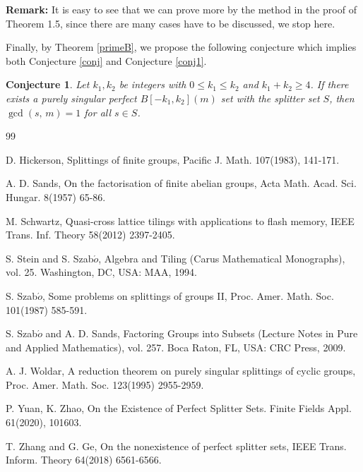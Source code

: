 \documentclass[12pt]{article}
\newtheorem{open problem}{Open problem}[section]
\newtheorem{conj}{Conjecture}[section]
\begin{document}
{\bf Remark:} It is easy to see that we can prove more by the method in the proof of Theorem 1.5, since there are many cases have to be discussed, we stop here.

Finally, by Theorem \ref{primeB}, we propose the following conjecture which implies both Conjecture \ref{conj} and  Conjecture \ref{conj1}.


\begin{conj} \label{conj2}
Let $k_1, k_2$ be integers with $0 \le k_1 \leq k_2$ and
$k_1 + k_2\ge 4$.
If there exists a purely singular perfect $B[-k_1,k_2](m)$ set with the splitter set $S$,
then $\gcd(s, \,m)=1$ for all $s\in S$.
\end{conj}






%
\begin{thebibliography}{99}

\bibitem{[H]} D. Hickerson, Splittings of finite groups,  Pacific J. Math. 107(1983), 141-171.

 A. D. Sands,  On the factorisation of finite abelian groups,  Acta Math. Acad. Sci. Hungar. 8(1957) 65-86.


\bibitem{[SC]} M. Schwartz, Quasi-cross lattice tilings with applications to flash
memory, IEEE Trans. Inf. Theory 58(2012) 2397-2405.



\bibitem{[SAT]}  S. Stein and S. Szab$\acute{o}$, Algebra and Tiling (Carus Mathematical
Monographs), vol. 25. Washington, DC, USA: MAA,
1994.



\bibitem{[SS]} S. Szab$\acute{o}$, Some problems on splittings of groups II,  Proc. Amer. Math.
Soc. 101(1987) 585-591.

 S. Szab$\acute{o}$ and A. D. Sands, Factoring Groups into Subsets (Lecture Notes
in Pure and Applied Mathematics), vol. 257. Boca Raton, FL, USA: CRC Press, 2009.



\bibitem{[W]} A. J. Woldar, A reduction theorem on purely singular splittings of cyclic
groups, Proc. Amer. Math. Soc. 123(1995) 2955-2959.

\bibitem{[PK]} P. Yuan, K. Zhao,  On the Existence of Perfect Splitter Sets. Finite Fields Appl.  61(2020), 101603.

\bibitem{[ZG]} T. Zhang and G. Ge, On the nonexistence of perfect splitter sets, IEEE Trans. Inform. Theory 64(2018) 6561-6566.




\end{thebibliography}
\end{document}
